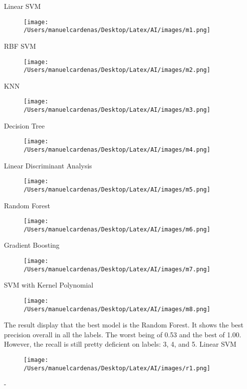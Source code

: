 \documentclass{article}
\begin{document}
    Linear SVM
    \begin{figure}[h]
        \centering
        \texttt{[image: /Users/manuelcardenas/Desktop/Latex/AI/images/m1.png]}
        \label{fig:m1}
    \end{figure}

    RBF SVM \pagebreak
    \begin{figure}[h]
        \centering
        \texttt{[image: /Users/manuelcardenas/Desktop/Latex/AI/images/m2.png]}
        \label{fig:m2}
    \end{figure}

    KNN
    \begin{figure}[h]
        \centering
        \texttt{[image: /Users/manuelcardenas/Desktop/Latex/AI/images/m3.png]}
        \label{fig:m3}
    \end{figure}

    Decision Tree\pagebreak
    \begin{figure}[h]
        \centering
        \texttt{[image: /Users/manuelcardenas/Desktop/Latex/AI/images/m4.png]}
        \label{fig:m4}
    \end{figure}

    Linear Discriminant Analysis
    \begin{figure}[h]
        \centering
        \texttt{[image: /Users/manuelcardenas/Desktop/Latex/AI/images/m5.png]}
        \label{fig:m5}
    \end{figure}

    Random Forest\pagebreak
    \begin{figure}[h]
        \centering
        \texttt{[image: /Users/manuelcardenas/Desktop/Latex/AI/images/m6.png]}
        \label{fig:m6}
    \end{figure}

    Gradient Boosting
    \begin{figure}[h]
        \centering
        \texttt{[image: /Users/manuelcardenas/Desktop/Latex/AI/images/m7.png]}
        \label{fig:m7}
    \end{figure}

    SVM with Kernel Polynomial\pagebreak
    \begin{figure}[h]
        \centering
        \texttt{[image: /Users/manuelcardenas/Desktop/Latex/AI/images/m8.png]}
        \label{fig:m8}
    \end{figure}

    The result display that the best model is the Random Forest. It shows the best precision overall in all the labels.
     The worst being of 0.53 and the best of 1.00. However, the recall is still pretty deficient on labels: 3, 4, and 5. \pagebreak
     Linear SVM
    \begin{figure}[h]
        \centering
        \texttt{[image: /Users/manuelcardenas/Desktop/Latex/AI/images/r1.png]}
        \label{fig:r1}
    \end{figure}
    - \pagebreak
\end{document}
